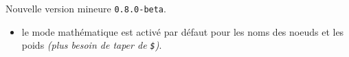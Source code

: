 Nouvelle version mineure \verb+0.8.0-beta+.

\begin{itemize}[itemsep=.5em]
    \item {}
          le mode mathématique est activé par défaut pour les noms des noeuds et les poids \emph{(plus besoin de taper de \texttt{\$})}.
\end{itemize}


\separation